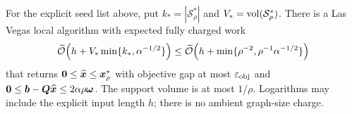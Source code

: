 \begin{theorem}
\label{thm:general-seed-randomized}
For the explicit seed list above, put
$k_*=|\mathcal S_\rho^*|$ and $V_*=\operatorname{vol}(\mathcal S_\rho^*)$.
There is a Las Vegas local algorithm with expected fully charged work
\begin{equation*}
 \widetilde{\mathcal{O}}\!\left(h+V_*\min\{k_*,\alpha^{-1/2}\}\right)
 \leq\widetilde{\mathcal{O}}\!\left(h+
          \min\{\rho^{-2},\rho^{-1}\alpha^{-1/2}\}\right)
\end{equation*}
that returns $\bm{0}\leq\widehat{\bm{x}}\leq\bm{x}_\rho^*$ with objective
gap at most $\varepsilon_{\mathrm{obj}}$ and
$\bm{0}\leq\bm{b}-\bm{Q}\widehat{\bm{x}}\leq2\alpha\rho\bm{\omega}$.
The support volume is at most $1/\rho$. Logarithms may include the
explicit input length $h$; there is no ambient graph-size charge.
\end{theorem}
